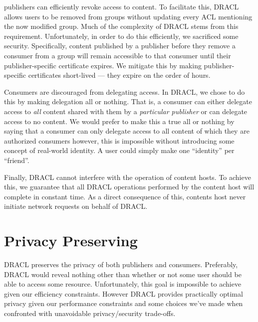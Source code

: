 \documentclass[pdftex,12pt,a4papaer]{report}
\begin{document}
publishers can efficiently revoke access to content. To facilitate this,
DRACL allows users to be removed from groups without updating every ACL
mentioning the now modified group. Much of the complexity of DRACL stems from
this requirement. Unfortunately, in order to do this efficiently, we sacrificed
some security. Specifically, content published by a publisher before they
remove a consumer from a group will remain accessible to that consumer until
their publisher-specific certificate expires. We mitigate this by making
publisher-specific certificates short-lived --- they expire on the order of hours.

Consumers are discouraged from delegating access. In DRACL, we chose to do this
by making delegation all or nothing. That is, a consumer can either delegate
access to \emph{all} content shared with them by a \emph{particular publisher} or can delegate access to no content. We would prefer to make this a true
all or nothing by saying that a consumer can only delegate access to all content
of which they are authorized consumers however, this is impossible without
introducing some concept of real-world identity. A user could simply make one
``identity'' per ``friend''. 

Finally, DRACL cannot interfere with the operation of content hosts. To achieve
this, we guarantee that all DRACL operations performed by the content host will
complete in constant time. As a direct consequence of this, contents host never
initiate network requests on behalf of DRACL\@.

\section{Privacy Preserving}
\label{sec:privacy}

DRACL preserves the privacy of both publishers and consumers. Preferably,
DRACL would reveal nothing other than whether or not some user should be able to
access some resource. Unfortunately, this goal is impossible to achieve given
our efficiency constraints. However DRACL provides practically optimal privacy
given our performance constraints and some choices we've made when confronted
with unavoidable privacy/security trade-offs.
\end{document}
